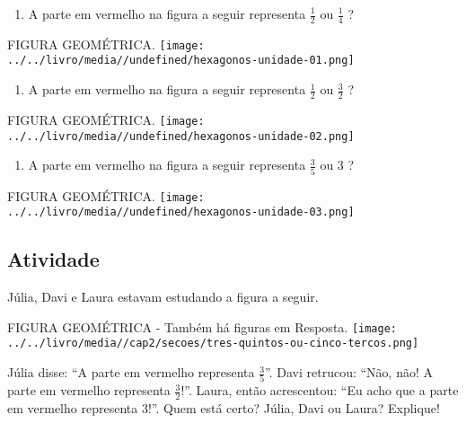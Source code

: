 \documentclass[a4,12pt]{book}
\begin{document}
\begin{enumerate} [\quad a)] %
  \item     A parte em vermelho na figura a seguir representa     $\frac{1}{2}$     ou     $\frac{1}{4}$    ? 
\end{enumerate} %
\begin{imagem*}[breakable]{}{}   FIGURA GEOMÉTRICA.    \texttt{[image: ../../livro/media//undefined/hexagonos-unidade-01.png]}\end{imagem*}
\begin{enumerate} [\quad a)] %
  \item     A parte em vermelho na figura a seguir representa     $\frac{1}{2}$     ou     $\frac{3}{2}$    ? 
\end{enumerate} %
\begin{imagem*}[breakable]{}{}   FIGURA GEOMÉTRICA.    \texttt{[image: ../../livro/media//undefined/hexagonos-unidade-02.png]}\end{imagem*}
\begin{enumerate} [\quad a)] %
  \item     A parte em vermelho na figura a seguir representa     $\frac{3}{5}$     ou     $3$    ?
\end{enumerate} %
\begin{imagem*}[breakable]{}{}   FIGURA GEOMÉTRICA.    \texttt{[image: ../../livro/media//undefined/hexagonos-unidade-03.png]}\end{imagem*}







\subsection{Atividade}







Júlia, Davi e Laura estavam estudando a figura a seguir.
\begin{imagem*}[breakable]{}{}   FIGURA GEOMÉTRICA -  Também há figuras em Resposta.  
    \texttt{[image: ../../livro/media//cap2/secoes/tres-quintos-ou-cinco-tercos.png]}  
\end{imagem*}

Júlia disse: ``A parte em vermelho representa $\frac{3}{5}$''. Davi retrucou: ``Não, não! A parte em vermelho representa $\frac{3}{2}$!''. Laura, então acrescentou: ``Eu acho que a parte em vermelho representa $3$!''. Quem está certo? Júlia, Davi ou Laura? Explique!
\end{document}
